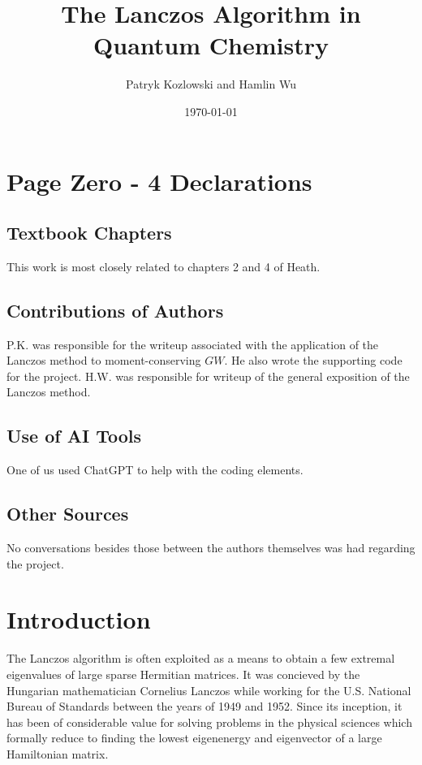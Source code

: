 \documentclass[12pt]{article} %
\title{The Lanczos Algorithm in Quantum Chemistry}
\author{Patryk Kozlowski and Hamlin Wu}
\date{\today}
\begin{document}
\maketitle
\section*{Page Zero - 4 Declarations}
\subsection*{Textbook Chapters}
This work is most closely related to chapters 2 and 4 of Heath. 
\subsection*{Contributions of Authors}
P.K. was responsible for the writeup associated with the application of the Lanczos method to moment-conserving $GW$. He also wrote the supporting code for the project. H.W. was responsible for writeup of the general exposition of the Lanczos method.
\subsection*{Use of AI Tools}
One of us used ChatGPT to help with the coding elements.
\subsection*{Other Sources}
No conversations besides those between the authors themselves was had regarding the project.
\clearpage
\section{Introduction}
The Lanczos algorithm is often exploited as a means to obtain a few extremal eigenvalues of large sparse Hermitian matrices. It was concieved by the Hungarian mathematician Cornelius Lanczos while working for the U.S. National Bureau of Standards between the years of 1949 and 1952. \cite{golubHistory, Lanczos:1950zz} Since its inception, it has been of considerable value for solving problems in the physical sciences which formally reduce to finding the lowest eigenenergy and eigenvector of a large Hamiltonian matrix.
\end{document}
